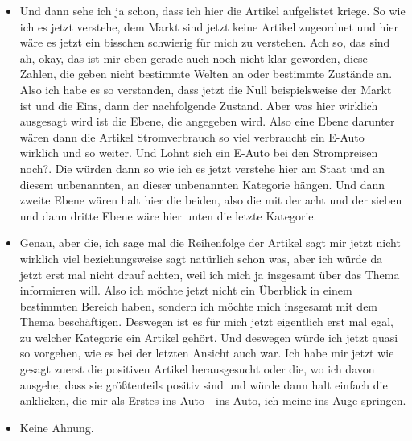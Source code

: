 {\begin{itemize}[]
                  Und deswegen würde ich halt jetzt erst mal die mich auf die Artikel konzentrieren oder auf die Welten konzentrieren, die halt positiv bewertet sind.
                  Wobei natürlich überall ein positiver Anteil drin ist.
                  Deswegen gehe ich jetzt einfach mal zuerst auf den Markt klicken, weil der halt durchgehend positiv ist.
            \item {} Und dann sehe ich ja schon, dass ich hier die Artikel aufgelistet kriege.
                  So wie ich es jetzt verstehe, dem Markt sind jetzt keine Artikel zugeordnet und hier wäre es jetzt ein bisschen schwierig für mich zu verstehen.
                  Ach so, das sind ah, okay, das ist mir eben gerade auch noch nicht klar geworden, diese Zahlen, die geben nicht bestimmte Welten an oder bestimmte Zustände an.
                  Also ich habe es so verstanden, dass jetzt die Null beispielsweise der Markt ist und die Eins, dann der nachfolgende Zustand.
                  Aber was hier wirklich ausgesagt wird ist die Ebene, die angegeben wird.
                  Also eine Ebene darunter wären dann die Artikel \flqq Stromverbrauch so viel verbraucht ein E-Auto wirklich\frqq{} und so weiter.
                  Und \flqq Lohnt sich ein E-Auto bei den Strompreisen noch?\frqq{}.
                  Die würden dann so wie ich es jetzt verstehe hier am Staat und an diesem unbenannten, an dieser unbenannten Kategorie hängen.
                  Und dann zweite Ebene wären halt hier die beiden, also die mit der acht und der sieben und dann dritte Ebene wäre hier unten die letzte Kategorie.
            \item {} Genau, aber die, ich sage mal die Reihenfolge der Artikel sagt mir jetzt nicht wirklich viel beziehungsweise sagt natürlich schon was, aber ich würde da jetzt erst mal nicht drauf achten, weil ich mich ja insgesamt über das Thema informieren will.
                  Also ich möchte jetzt nicht ein Überblick in einem bestimmten Bereich haben, sondern ich möchte mich insgesamt mit dem Thema beschäftigen.
                  Deswegen ist es für mich jetzt eigentlich erst mal egal, zu welcher Kategorie ein Artikel gehört.
                  Und deswegen würde ich jetzt quasi so vorgehen, wie es bei der letzten Ansicht auch war.
                  Ich habe mir jetzt wie gesagt zuerst die positiven Artikel herausgesucht oder die, wo ich davon ausgehe, dass sie größtenteils positiv sind und würde dann halt einfach die anklicken, die mir als Erstes ins Auto - ins Auto, ich meine ins Auge springen.
            \item {} Keine Ahnung.

\end{itemize}}
